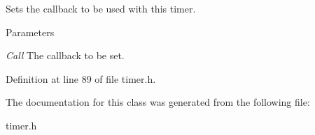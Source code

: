Sets the callback to be used with this timer. 


\begin{DoxyParams}{Parameters}
\item[{\em Call}]The callback to be set. \end{DoxyParams}


Definition at line 89 of file timer.h.



The documentation for this class was generated from the following file:\begin{DoxyCompactItemize}
\item 
timer.h\end{DoxyCompactItemize}
